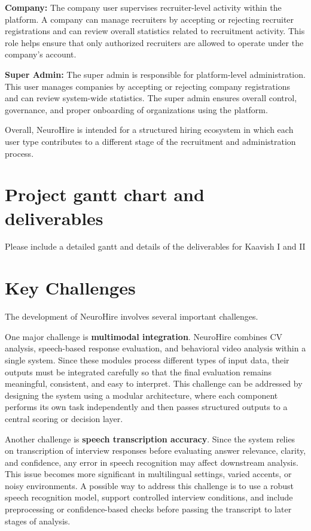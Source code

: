 \textbf{Company:}  
The company user supervises recruiter-level activity within the platform. A company can manage recruiters by accepting or rejecting recruiter registrations and can review overall statistics related to recruitment activity. This role helps ensure that only authorized recruiters are allowed to operate under the company’s account.

\textbf{Super Admin:}  
The super admin is responsible for platform-level administration. This user manages companies by accepting or rejecting company registrations and can review system-wide statistics. The super admin ensures overall control, governance, and proper onboarding of organizations using the platform.

Overall, NeuroHire is intended for a structured hiring ecosystem in which each user type contributes to a different stage of the recruitment and administration process.

\section{Project gantt chart and deliverables}
Please include a detailed gantt and details of the deliverables for Kaavish I and II

\section{Key Challenges}
The development of NeuroHire involves several important challenges.

One major challenge is \textbf{multimodal integration}. NeuroHire combines CV analysis, speech-based response evaluation, and behavioral video analysis within a single system. Since these modules process different types of input data, their outputs must be integrated carefully so that the final evaluation remains meaningful, consistent, and easy to interpret. This challenge can be addressed by designing the system using a modular architecture, where each component performs its own task independently and then passes structured outputs to a central scoring or decision layer.

Another challenge is \textbf{speech transcription accuracy}. Since the system relies on transcription of interview responses before evaluating answer relevance, clarity, and confidence, any error in speech recognition may affect downstream analysis. This issue becomes more significant in multilingual settings, varied accents, or noisy environments. A possible way to address this challenge is to use a robust speech recognition model, support controlled interview conditions, and include preprocessing or confidence-based checks before passing the transcript to later stages of analysis.

